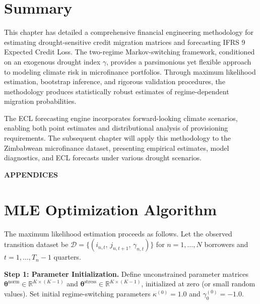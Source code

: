 \documentclass[12pt,a4paper]{article}
\begin{document}
\section{Summary}

This chapter has detailed a comprehensive financial engineering methodology for estimating drought-sensitive credit migration matrices and forecasting IFRS 9 Expected Credit Loss. The two-regime Markov-switching framework, conditioned on an exogenous drought index $\gamma$, provides a parsimonious yet flexible approach to modeling climate risk in microfinance portfolios. Through maximum likelihood estimation, bootstrap inference, and rigorous validation procedures, the methodology produces statistically robust estimates of regime-dependent migration probabilities. 

The ECL forecasting engine incorporates forward-looking climate scenarios, enabling both point estimates and distributional analysis of provisioning requirements. The subsequent chapter will apply this methodology to the Zimbabwean microfinance dataset, presenting empirical estimates, model diagnostics, and ECL forecasts under various drought scenarios.

\newpage

\appendix
\begin{center}
    {\LARGE\bfseries APPENDICES}
\end{center}

\vspace{1cm}

\renewcommand{\thesection}{\Alph{section}}

\section{MLE Optimization Algorithm}
\label{app:mle}

The maximum likelihood estimation proceeds as follows. Let the observed transition dataset be $\mathcal{D} = \{(i_{n,t},\, j_{n,t+1},\, \gamma_{n,t})\}$ for $n = 1, \ldots, N$ borrowers and $t = 1, \ldots, T_n - 1$ quarters.

\textbf{Step 1: Parameter Initialization.} Define unconstrained parameter matrices $\boldsymbol{\theta}^{\text{norm}} \in \mathbb{R}^{K \times (K-1)}$ and $\boldsymbol{\theta}^{\text{stress}} \in \mathbb{R}^{K \times (K-1)}$, initialized at zero (or small random values). Set initial regime-switching parameters $\kappa^{(0)} = 1.0$ and $\gamma_0^{(0)} = -1.0$.
\end{document}
